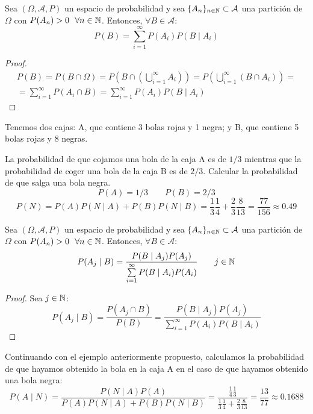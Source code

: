 \begin{teo}
    Sea $(\Omega, \mathcal{A}, P)$ un espacio de probabilidad y sea $\{A_n\}_{n \in \mathbb N} \subset \mathcal{A}$ una partición de $\Omega$ con $P(A_n)>0~~\forall n \in \mathbb N$. Entonces, $\forall B \in \mathcal{A}$:
    $$P(B) = \sum_{i=1}^\infty P(A_i)P(B \mid A_i) $$
\end{teo}
\begin{proof}
    \begin{multline*}
        P(B)
        = P(B \cap \Omega)
        = P\left(B \cap \left( \bigcup_{i=1}^\infty A_i \right)\right)
        = P\left(\bigcup_{i=1}^\infty (B \cap  A_i) \right) = \\
        = \sum_{i=1}^\infty P(A_i \cap B)
        = \sum_{i=1}^\infty P(A_i) P(B \mid A_i)
    \end{multline*}
\end{proof}

\begin{ejemplo}
    Tenemos dos cajas: A, que contiene 3 bolas rojas y 1 negra; y B, que contiene 5 bolas rojas y 8 negras.
    
    La probabilidad de que cojamos una bola de la caja A es de $1/3$ mientras que la probabilidad de coger una bola de la caja B es de $2/3$. Calcular la probabilidad de que salga una bola negra.
    $$P(A) = 1/3 \qquad P(B) = 2/3$$
    $$P(N) = P(A)P(N \mid A) + P(B)P(N \mid B) = \frac{1}{3} \frac{1}{4} + \frac{2}{3} \frac{8}{13} = \frac{77}{156} \approx 0.49$$
\end{ejemplo}

\begin{teo}
  Sea $(\Omega, \mathcal{A}, P)$ un espacio de probabilidad y sea $\{A_n\}_{n \in \mathbb N} \subset \mathcal{A}$ una partición de $\Omega$ con $P(A_n)>0~~\forall n \in \mathbb N$. Entonces, $\forall B \in \mathcal{A}$:
  $$P(A_j \mid B) = \dfrac{P(B \mid A_j)P(A_j)}{\sum\limits_{i=1}^\infty P(B \mid A_i)P(A_i)}\qquad j \in \mathbb N$$
\end{teo}
\begin{proof}
  Sea $j \in \mathbb N$:
  $$P(A_j \mid B) = \dfrac{P(A_j \cap B)}{P(B)} =
    \dfrac{P(B \mid A_j)P(A_j)}{\sum\limits_{i=1}^\infty P(A_i) P(B \mid A_i)}$$
\end{proof}

\begin{ejemplo}
    Continuando con el ejemplo anteriormente propuesto, calculamos la probabilidad de que hayamos obtenido la bola en la caja A en el caso de que hayamos obtenido una bola negra:
    $$P(A \mid N) = \dfrac{P(N \mid A)P(A)}{P(A)P(N \mid A)+P(B)P(N \mid B)} =
      \dfrac{\frac{1}{4}\frac{1}{3}}{\frac{1}{3}\frac{1}{4}+\frac{2}{3}\frac{8}{13}}=\frac{13}{77}
      \approx 0.1688$$
\end{ejemplo}

